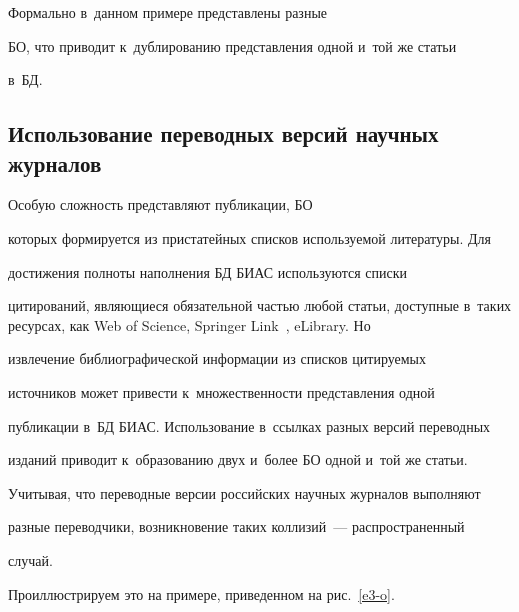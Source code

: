   Формально в~данном примере представлены разные


БО, что приводит к~дуб\-ли\-рованию представления одной и~той же статьи


в~БД.





\vspace*{-4pt}





\subsection{Использование переводных версий научных журналов}





\vspace*{-2pt}





  Особую сложность представляют публикации, БО


которых формируется из пристатейных списков используемой литературы. Для


достижения полноты наполнения БД БИАС используются списки


цитирований, являющиеся обязательной частью любой статьи, доступные в~таких ресурсах, как Web of Science, Springer Link~\cite{3-o}, eLibrary. Но


извлечение библиографической информации из списков цитируемых


источников может привести к~множественности представления одной


публикации в~БД БИАС. Использование в~ссылках разных версий переводных


изданий приводит к~образованию двух и~более БО одной и~той же статьи.


Учитывая, что переводные версии российских научных журналов выполняют


разные переводчики, возникновение таких коллизий~--- распространенный


случай.








  Проиллюстрируем это на примере, приведенном на рис.~\ref{e3-o}.





\vspace*{-4pt}





